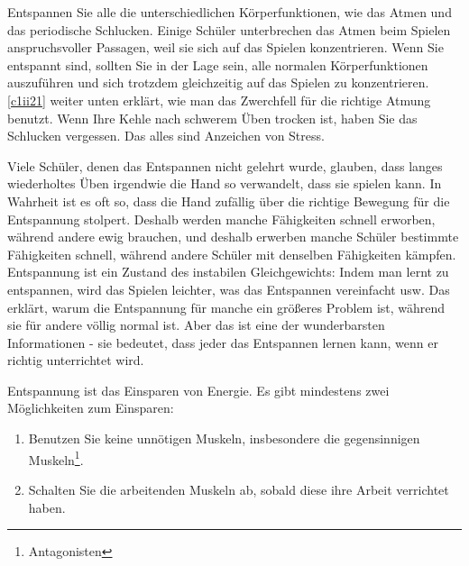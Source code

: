 Entspannen Sie alle die unterschiedlichen Körperfunktionen, wie das Atmen und das periodische Schlucken.
Einige Schüler unterbrechen das Atmen beim Spielen anspruchsvoller Passagen, weil sie sich auf das Spielen konzentrieren.
Wenn Sie entspannt sind, sollten Sie in der Lage sein, alle normalen Körperfunktionen auszuführen und sich trotzdem gleichzeitig auf das Spielen zu konzentrieren.
\hyperref[c1ii21]{\ref*{c1ii21}} weiter unten erklärt, wie man das Zwerchfell für die richtige Atmung benutzt.
Wenn Ihre Kehle nach schwerem Üben trocken ist, haben Sie das Schlucken vergessen.
Das alles sind Anzeichen von Stress.

Viele Schüler, denen das Entspannen nicht gelehrt wurde, glauben, dass langes wiederholtes Üben irgendwie die Hand so verwandelt, dass sie spielen kann.
In Wahrheit ist es oft so, dass die Hand zufällig über die richtige Bewegung für die Entspannung stolpert.
Deshalb werden manche Fähigkeiten schnell erworben, während andere ewig brauchen, und deshalb erwerben manche Schüler bestimmte Fähigkeiten schnell, während andere Schüler mit denselben Fähigkeiten kämpfen.
Entspannung ist ein Zustand des instabilen Gleichgewichts: Indem man lernt zu entspannen, wird das Spielen leichter, was das Entspannen vereinfacht usw.
Das erklärt, warum die Entspannung für manche ein größeres Problem ist, während sie für andere völlig normal ist.
Aber das ist eine der wunderbarsten Informationen - sie bedeutet, dass jeder das Entspannen lernen kann, wenn er richtig unterrichtet wird.

Entspannung ist das Einsparen von Energie.
Es gibt mindestens zwei Möglichkeiten zum Einsparen:

\begin{enumerate}[label={\arabic*.}] 
 \item Benutzen Sie keine unnötigen Muskeln, insbesondere die gegensinnigen Muskeln\footnote{Antagonisten}.
 \item Schalten Sie die arbeitenden Muskeln ab, sobald diese ihre Arbeit verrichtet haben.
\end{enumerate}

